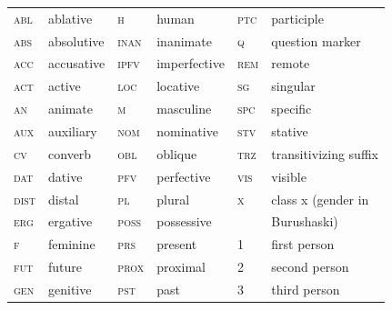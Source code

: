 \documentclass[output=collectionpaper]{langsci/langscibook}
\begin{document}
\begin{tabular}{llllll}
\textsc{abl} 	&	 ablative	&	\textsc{h} 	&	 human	&	\textsc{ptc} 	&	 participle	\\
\textsc{abs} 	&	 absolutive	&	\textsc{inan} 	&	 inanimate	&	\textsc{q} 	&	 question marker	\\
\textsc{acc} 	&	 accusative	&	\textsc{ipfv} 	&	 imperfective	&	\textsc{rem} 	&	 remote	\\
\textsc{act} 	&	 active	&	\textsc{loc} 	&	 locative	&	\textsc{sg} 	&	 singular	\\
\textsc{an} 	&	 animate	&	\textsc{m} 	&	 masculine	&	\textsc{spc} 	&	 specific	\\
\textsc{aux} 	&	 auxiliary	&	\textsc{nom} 	&	 nominative	&	\textsc{stv} 	&	 stative 	\\
\textsc{cv} 	&	 converb	&	\textsc{obl} 	&	 oblique	&	\textsc{trz} 	&	 transitivizing suffix	\\
\textsc{dat} 	&	 dative	&	\textsc{pfv} 	&	 perfective	&	\textsc{vis} 	&	 visible	\\
\textsc{dist} 	&	 distal	&	\textsc{pl} 	&	 plural	&	\textsc{x} 	&	 class x (gender in	\\
\textsc{erg} 	&	 ergative	&	\textsc{poss} 	&	 possessive	&		&	Burushaski)	\\
\textsc{f} 	&	 feminine	&	\textsc{prs} 	&	 present	&	1 	&	 first person	\\
\textsc{fut} 	&	 future	&	\textsc{prox} 	&	 proximal	&	2 	&	 second person	\\
\textsc{gen} 	&	 genitive	&	\textsc{pst} 	&	 past	&	3 	&	 third person	\\
\end{tabular}





\begingroup
\setlength{\emergencystretch}{8em}
\printbibliography[heading=subbibliography,notkeyword=this]
\endgroup

\label{lastpage:Liljegren}
\end{document}
